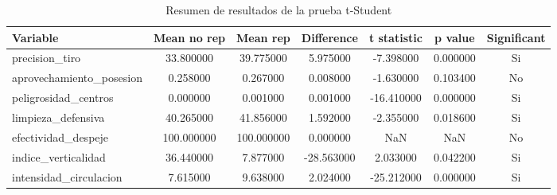 \begin{table}
\caption{Resumen de resultados de la prueba t-Student}
\label{tab:ttest_summary}
\begin{tabular}{lcccccc}
\toprule
Variable & Mean no rep & Mean rep & Difference & t statistic & p value & Significant \\
\midrule
precision\_tiro & 33.800000 & 39.775000 & 5.975000 & -7.398000 & 0.000000 & Si \\
aprovechamiento\_posesion & 0.258000 & 0.267000 & 0.008000 & -1.630000 & 0.103400 & No \\
peligrosidad\_centros & 0.000000 & 0.001000 & 0.001000 & -16.410000 & 0.000000 & Si \\
limpieza\_defensiva & 40.265000 & 41.856000 & 1.592000 & -2.355000 & 0.018600 & Si \\
efectividad\_despeje & 100.000000 & 100.000000 & 0.000000 & NaN & NaN & No \\
indice\_verticalidad & 36.440000 & 7.877000 & -28.563000 & 2.033000 & 0.042200 & Si \\
intensidad\_circulacion & 7.615000 & 9.638000 & 2.024000 & -25.212000 & 0.000000 & Si \\
\bottomrule
\end{tabular}
\end{table}
